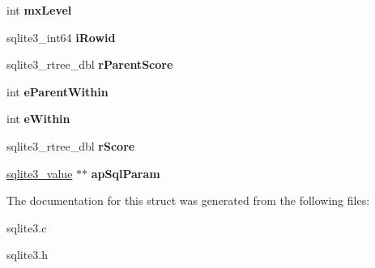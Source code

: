 \begin{DoxyCompactItemize}
\item 
int {\bfseries mx\+Level}\hypertarget{structsqlite3__rtree__query__info_ac84533734fb4c86c3f2deba904118785}{}\label{structsqlite3__rtree__query__info_ac84533734fb4c86c3f2deba904118785}

\item 
sqlite3\+\_\+int64 {\bfseries i\+Rowid}\hypertarget{structsqlite3__rtree__query__info_a9e43489993c8aeace851f86eaa00ec26}{}\label{structsqlite3__rtree__query__info_a9e43489993c8aeace851f86eaa00ec26}

\item 
sqlite3\+\_\+rtree\+\_\+dbl {\bfseries r\+Parent\+Score}\hypertarget{structsqlite3__rtree__query__info_af7da93e7fc405eec7e7ec90ab237eab2}{}\label{structsqlite3__rtree__query__info_af7da93e7fc405eec7e7ec90ab237eab2}

\item 
int {\bfseries e\+Parent\+Within}\hypertarget{structsqlite3__rtree__query__info_a8bd37c6af5427c35830f674a4db682c3}{}\label{structsqlite3__rtree__query__info_a8bd37c6af5427c35830f674a4db682c3}

\item 
int {\bfseries e\+Within}\hypertarget{structsqlite3__rtree__query__info_ad1038309f7ea55472a7ff99bf4f9d514}{}\label{structsqlite3__rtree__query__info_ad1038309f7ea55472a7ff99bf4f9d514}

\item 
sqlite3\+\_\+rtree\+\_\+dbl {\bfseries r\+Score}\hypertarget{structsqlite3__rtree__query__info_af449e4a3607573d17b3d31c67b6e1584}{}\label{structsqlite3__rtree__query__info_af449e4a3607573d17b3d31c67b6e1584}

\item 
\hyperlink{structMem}{sqlite3\+\_\+value} $\ast$$\ast$ {\bfseries ap\+Sql\+Param}\hypertarget{structsqlite3__rtree__query__info_a91c604c985d05e67f08b7370d7bf92aa}{}\label{structsqlite3__rtree__query__info_a91c604c985d05e67f08b7370d7bf92aa}

\end{DoxyCompactItemize}


The documentation for this struct was generated from the following files\+:\begin{DoxyCompactItemize}
\item 
sqlite3.\+c\item 
sqlite3.\+h\end{DoxyCompactItemize}
